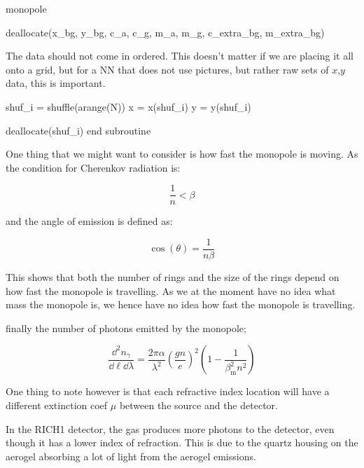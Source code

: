\documentclass[10pt, a4paper]{article}
\begin{document}
\begin{codeblock}{monopole}
\begin{code}
	deallocate(x_bg, y_bg, c_a, c_g, m_a, m_g, c_extra_bg, m_extra_bg)
\end{code}

The data should not come in ordered. This doesn't matter if we are placing it all onto a grid, but for a NN that does not use pictures, but rather raw sets of $x$,$y$ data, this is important. 

\begin{code}
	shuf_i = shuffle(arange(N))
	x = x(shuf_i)
	y = y(shuf_i)
	
	deallocate(shuf_i)
end subroutine
\end{code}
\end{codeblock}

One thing that we might want to consider is how fast the monopole is moving. 
As the condition for Cherenkov radiation is:

\begin{equation}
\frac{1}{n} < \beta
\end{equation}

and the angle of emission is defined as:

\begin{equation}
\cos(\theta) = \frac{1}{n\beta}
\end{equation}

This shows that both the number of rings and the size of the rings depend on how fast the monopole is travelling. 
As we at the moment have no idea what mass the monopole is, we hence have no idea how fast the monopole is travelling. 

finally the number of photons emitted by the monopole;

\begin{equation}
 \frac{\dd^2 n_\gamma}{\dd \ell \dd \lambda} = \frac{2 \pi \alpha}{\lambda ^2} \left( \frac{gn}{e}\right)^2\left( 1 - \frac{1}{\beta^2_\text{m}n^2}\right) \label{eqn:ng}
\end{equation}

One thing to note however is that each refractive index location will have a different extinction coef $\mu$ between the source and the detector. 

In the RICH1 detector, the gas produces more photons to the detector, even though it has a lower index of refraction. This is due to the quartz housing on the aerogel absorbing a lot of light from the aerogel emissions. 
\end{document}
